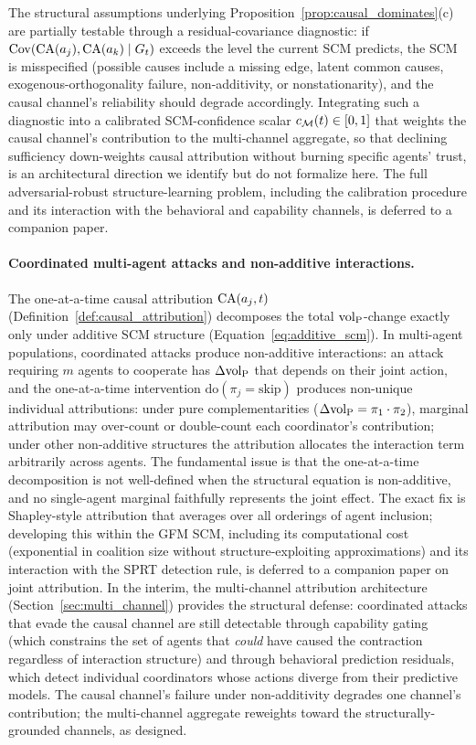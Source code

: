 The structural assumptions underlying
Proposition~\ref{prop:causal_dominates}(c) are partially testable
through a residual-covariance diagnostic: if
$\mathrm{Cov}(\mathrm{CA}(a_j), \mathrm{CA}(a_k) \mid G_t)$ exceeds
the level the current SCM predicts, the SCM is misspecified
(possible causes include a missing edge, latent common causes,
exogenous-orthogonality failure, non-additivity, or nonstationarity),
and the causal channel's reliability should degrade accordingly. Integrating such a
diagnostic into a calibrated SCM-confidence scalar
$c_{\mathcal{M}}(t) \in [0,1]$ that weights the causal channel's
contribution to the multi-channel aggregate, so that declining
sufficiency down-weights causal attribution without burning specific
agents' trust, is an architectural direction we identify but do
not formalize here. The full adversarial-robust structure-learning
problem, including the calibration procedure and its interaction
with the behavioral and capability channels, is deferred to a
companion paper.

\paragraph{Coordinated multi-agent attacks and non-additive
interactions.} The one-at-a-time causal attribution
$\mathrm{CA}(a_j, t)$ (Definition~\ref{def:causal_attribution})
decomposes the total ${\operatorname{vol}_{\mathrm{P}}}$-change exactly only under additive SCM
structure (Equation~\eqref{eq:additive_scm}). In multi-agent
populations, coordinated attacks produce non-additive interactions:
an attack requiring $m$ agents to cooperate has
$\Delta {\operatorname{vol}_{\mathrm{P}}}$ that depends on their joint action, and the
one-at-a-time intervention $\mathrm{do}(\pi_j = \mathrm{skip})$
produces non-unique individual attributions: under pure
complementarities ($\Delta {\operatorname{vol}_{\mathrm{P}}} = \pi_1 \cdot \pi_2$), marginal
attribution may over-count or double-count each coordinator's
contribution; under other non-additive structures the attribution
allocates the interaction term arbitrarily across agents. The
fundamental issue is that the one-at-a-time decomposition is not
well-defined when the structural equation is non-additive, and no
single-agent marginal faithfully represents the joint effect. The exact fix is
Shapley-style attribution
\citep{shapley1953value} that averages over all orderings of agent
inclusion; developing this within the GFM SCM, including its
computational cost (exponential in coalition size without
structure-exploiting approximations) and its interaction with the
SPRT detection rule, is deferred to a companion paper on joint
attribution. In the interim, the multi-channel attribution
architecture (Section~\ref{sec:multi_channel}) provides the
structural defense: coordinated attacks that evade the causal
channel are still detectable through capability gating
(which constrains the set of agents that \emph{could} have caused the
contraction regardless of interaction structure) and through
behavioral prediction residuals, which detect individual
coordinators whose actions diverge from their predictive models.
The causal channel's failure under non-additivity degrades one
channel's contribution; the multi-channel aggregate reweights
toward the structurally-grounded channels, as designed.

